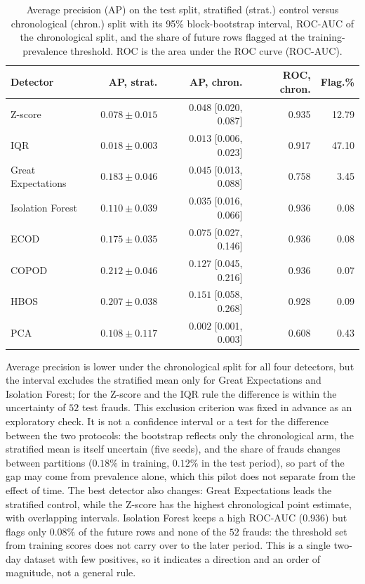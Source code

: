 \documentclass[conference]{IEEEtran}
\begin{document}
\begin{table}[t]
\caption{Average precision (AP) on the test split, stratified (strat.)
control versus chronological (chron.) split with its 95\% block-bootstrap
interval, ROC-AUC of the chronological split, and the share of future
rows flagged at the training-prevalence threshold. ROC is the area under the ROC curve (ROC-AUC).}
\label{tab:chrono}
\centering
\scriptsize
\setlength{\tabcolsep}{3pt}
\begin{tabular}{lrrrr}
\toprule
Detector & AP, strat. & AP, chron. & ROC, chron. & Flag.\% \\
\midrule
Z-score            & $0.078 \pm 0.015$ & $0.048$ [0.020, 0.087] & 0.935 & 12.79 \\
IQR                & $0.018 \pm 0.003$ & $0.013$ [0.006, 0.023] & 0.917 & 47.10 \\
Great Expectations & $0.183 \pm 0.046$ & $0.045$ [0.013, 0.088] & 0.758 & 3.45 \\
\midrule
Isolation Forest   & $0.110 \pm 0.039$ & $0.035$ [0.016, 0.066] & 0.936 & 0.08 \\
ECOD               & $0.175 \pm 0.035$ & $0.075$ [0.027, 0.146] & 0.936 & 0.08 \\
COPOD              & $0.212 \pm 0.046$ & $0.127$ [0.045, 0.216] & 0.936 & 0.07 \\
HBOS               & $0.207 \pm 0.038$ & $0.151$ [0.058, 0.268] & 0.928 & 0.09 \\
PCA                & $0.108 \pm 0.117$ & $0.002$ [0.001, 0.003] & 0.608 & 0.43 \\
\bottomrule
\end{tabular}
\end{table}

Average precision is lower under the chronological split for all four
detectors, but the interval excludes the stratified mean only for Great
Expectations and Isolation Forest; for the Z-score and the IQR rule the
difference is within the uncertainty of $52$ test frauds. This exclusion
criterion was fixed in advance as an exploratory check. It is not a confidence
interval or a test for the difference between the two protocols: the bootstrap
reflects only the chronological arm, the stratified mean is itself uncertain
(five seeds), and the share of frauds changes between partitions ($0.18\%$ in
training, $0.12\%$ in the test period), so part of the gap may come from
prevalence alone, which this pilot does not separate from the effect of time. The best detector
also changes: Great Expectations leads the stratified control, while the
Z-score has the highest chronological point estimate, with overlapping
intervals. Isolation Forest keeps a high ROC-AUC ($0.936$) but flags only
$0.08\%$ of the future rows and none of the $52$ frauds: the threshold set
from training scores does not carry over to the later period. This is a single
two-day dataset with few positives, so it indicates a direction and an order
of magnitude, not a general rule.
\end{document}
